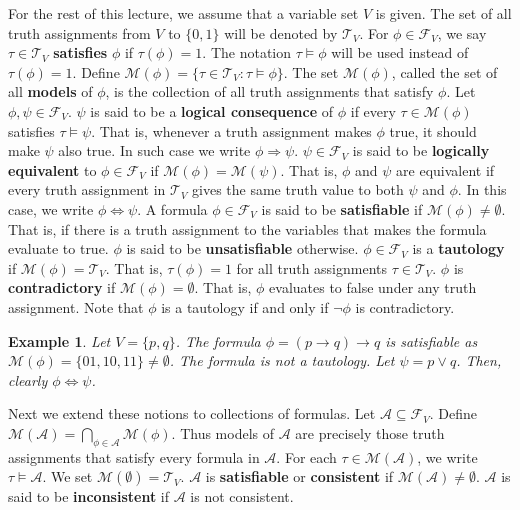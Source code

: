\documentclass[a4paper,11pt]{article}
\newtheorem{example}{Example}
\begin{document}
For the rest of this lecture, we assume that a variable set $V$ is given.  The set of all truth assignments
from $V$ to $\{0,1\}$ will be denoted by $\mathcal{T}_V$.  For $\phi \in \mathcal{F}_V$, we say $\tau\in \mathcal{T}_{V}$ {\bf satisfies} $\phi$ if 
$\tau(\phi)=1$. The notation $\tau \models \phi$ will be used instead of  $\tau(\phi)=1$.  
Define  $\mathcal{M}(\phi)=\{\tau \in \mathcal{T}_{V}:  \tau\models \phi \}$. The set $\mathcal{M}(\phi)$, called the set of all {\bf models} of $\phi$, is the 
collection of all truth assignments that satisfy $\phi$.  
Let $\phi, \psi\in \mathcal{F}_{V}$. $\psi$ is said to be a {\bf logical consequence} of $\phi$ if every
$\tau\in \mathcal{M}(\phi)$ satisfies $\tau \models \psi$.  That is, whenever a truth assignment makes
$\phi$ true, it should make $\psi$ also true.  In such case we write $\phi\Rightarrow\psi$.  
$\psi \in \mathcal{F}_V$ is said to be {\bf logically equivalent} to 
$\phi \in \mathcal{F}_V$ if $\mathcal{M}(\phi)=\mathcal{M}(\psi)$.  That
is, $\phi$ and $\psi$ are equivalent if every truth assignment in $\mathcal{T}_V$ gives the same truth value to both $\psi$ and $\phi$.
In this case, we write $\phi \Leftrightarrow \psi$.
A formula $\phi \in \mathcal{F}_V$ is said to be {\bf satisfiable} if $\mathcal{M}(\phi)\neq \emptyset$.  That is, if there is a truth assignment to 
the variables that makes the formula evaluate to true. $\phi$ is said to be {\bf unsatisfiable} otherwise.  
$\phi \in \mathcal{F}_V$ is a {\bf tautology} 
if $\mathcal{M}(\phi)=\mathcal{T}_{V}$.  That is,
$\tau(\phi)=1$ for all truth assignments $\tau\in \mathcal{T}_{V}$.  
$\phi$ is {\bf contradictory} if $\mathcal{M}(\phi)=\emptyset$.  
That is, $\phi$ evaluates to false under any truth assignment.  Note that $\phi$ is a tautology 
if and only if $\neg \phi$ is contradictory. 

\begin{example}
 Let $V=\{p,q\}$.  The formula $\phi=(p\rightarrow q)\rightarrow q$ is satisfiable as $\mathcal{M}(\phi)=\{01,10,11\}\neq \emptyset$. 
 The formula is not a tautology.  Let $\psi=p\vee q$.  Then, clearly $\phi\Leftrightarrow \psi$.  
\end{example}

Next we extend these notions to collections of formulas.   Let $\mathcal{A}\subseteq \mathcal{F}_V$.  Define
$\mathcal{M}(\mathcal{A})=\bigcap_{\phi \in \mathcal{A}}\mathcal{M}(\phi)$.  Thus models of $\mathcal{A}$ are precisely
those truth assignments that satisfy every formula in $\mathcal{A}$. For each $\tau \in \mathcal{M}(\mathcal{A})$, we
write $\tau \models \mathcal{A}$.  We set $\mathcal{M}({\emptyset})=\mathcal{T}_V$. 
$\mathcal{A}$ is  {\bf satisfiable} or {\bf consistent}
if $\mathcal{M(A)}\neq \emptyset$. $\mathcal{A}$ is said to be {\bf inconsistent} if $\mathcal{A}$ is not consistent. 
 
\end{document}

